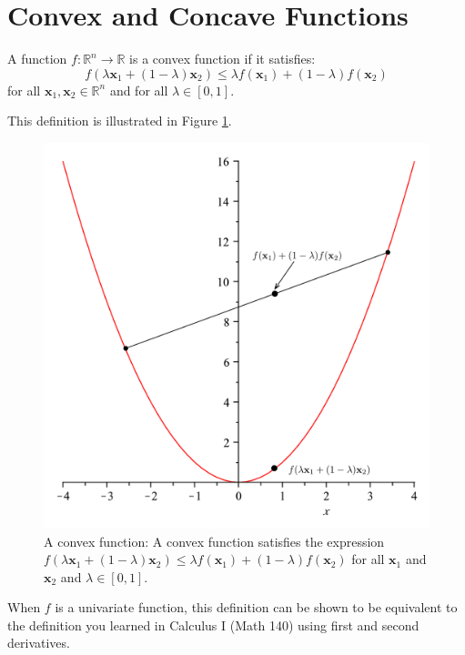 \section{Convex and Concave Functions}
\begin{definition} A function $f:\mathbb{R}^n \rightarrow \mathbb{R}$ is a convex function if it satisfies:
\begin{equation}
f(\lambda\mathbf{x}_1 + (1-\lambda)\mathbf{x}_2) \leq \lambda f(\mathbf{x}_1) + (1-\lambda)f(\mathbf{x}_2)
\end{equation}
for all $\mathbf{x}_1,\mathbf{x}_2 \in \mathbb{R}^n$ and for all $\lambda \in [0,1]$. 
\end{definition}
This definition is illustrated in Figure \ref{fig:QuadraticConvex}.
\begin{figure}[htbp]
\centering
\includegraphics[scale=0.25]{QuadraticConvex.pdf}
\caption{A convex function: A convex function satisfies the expression $f(\lambda\mathbf{x}_1 + (1-\lambda)\mathbf{x}_2) \leq \lambda f(\mathbf{x}_1) + (1-\lambda)f(\mathbf{x}_2)$ for all $\mathbf{x}_1$ and $\mathbf{x}_2$ and $\lambda \in [0,1]$.}
\label{fig:QuadraticConvex}
\end{figure}
When $f$ is a univariate function, this definition can be shown to be equivalent to the definition you learned in Calculus I (Math 140) using first and second derivatives.
